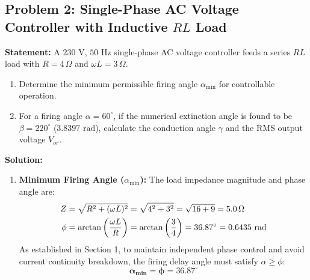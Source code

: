 \documentclass[11pt,a4paper]{article}
\begin{document}
\subsection{Problem 2: Single-Phase AC Voltage Controller with Inductive $RL$ Load}
\begin{examplebox}
\textbf{Statement:} A $230\text{ V}$, $50\text{ Hz}$ single-phase AC voltage controller feeds a series $RL$ load with $R = 4\,\Omega$ and $\omega L = 3\,\Omega$. 
\begin{enumerate}
  \item Determine the minimum permissible firing angle $\alpha_{\text{min}}$ for controllable operation.
  \item For a firing angle $\alpha = 60^\circ$, if the numerical extinction angle is found to be $\beta = 220^\circ$ ($3.8397\text{ rad}$), calculate the conduction angle $\gamma$ and the RMS output voltage $V_{or}$.
\end{enumerate}

\tcblower
\textbf{Solution:}
\begin{enumerate}
  \item \textbf{Minimum Firing Angle ($\alpha_{\text{min}}$):}
  The load impedance magnitude and phase angle are:
  \begin{align*}
  Z &= \sqrt{R^2 + (\omega L)^2} = \sqrt{4^2 + 3^2} = \sqrt{16 + 9} = 5.0\,\Omega \notag\\
  \phi &= \arctan\left(\frac{\omega L}{R}\right) = \arctan\left(\frac{3}{4}\right) = 36.87^\circ = 0.6435\text{ rad}
  \end{align*}
  As established in Section 1, to maintain independent phase control and avoid current continuity breakdown, the firing delay angle must satisfy $\alpha \ge \phi$:
  \begin{equation*}
  \mathbf{\alpha_{\text{min}} = \phi = 36.87^\circ}
  \end{equation*}


\end{enumerate}
\end{examplebox}
\end{document}
